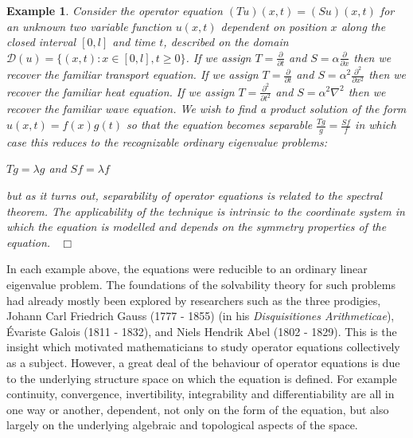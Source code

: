 \documentclass[12pt, oneside]{book}
\newtheorem{example}[theorem]{Example}
\newcommand{\qed}{\hfill ~$\Box$\\}
\begin{document}
\begin{example}
\normalfont
\noindent Consider the operator equation $(Tu)(x,t)=(Su)(x,t)$ for an unknown two variable function $u(x,t)$ dependent on position $x$ along the closed interval $[0,l]$ and time $t$,  described on the domain $\mathscr{D}(u)=\{ (x,t): x \in [0,l], t \geq 0 \}$.
\vskip 0.3cm
\noindent If we assign $T = \frac{\partial}{\partial t}$ and $S = \alpha \frac{\partial }{\partial x}$ then we recover the familiar transport equation.
\vskip 0.3cm
\noindent If we assign $T = \frac{\partial}{\partial t}$ and $S = \alpha^2 \frac{\partial^2 }{\partial x^2}$ then we recover the familiar heat equation.
\vskip 0.3cm
\noindent If we assign $T = \frac{\partial^2}{\partial t^2}$ and $S = \alpha^2 \nabla^2$ then we recover the familiar wave equation.
\vskip 0.3cm
\noindent We wish to find a product solution of the form $u(x,t)=f(x)g(t)$ so that the equation becomes separable $\frac{Tg}{g} = \frac{Sf}{f}$ in which case this reduces to the recognizable ordinary eigenvalue problems:
\begin{center}
$Tg= \lambda g$ \quad and \quad $Sf = \lambda f$
\end{center}
\noindent but as it turns out, separability of operator equations is related to the spectral theorem. The applicability of the technique is intrinsic to the coordinate system in which the equation is modelled and depends on the symmetry properties of the equation.
\qed
\end{example}
\noindent In each example above, the equations were reducible to an ordinary linear eigenvalue problem. The foundations of the solvability theory for such problems had already mostly been explored by researchers such as the three prodigies, Johann Carl Friedrich Gauss (1777 - 1855) 
(in his \textit{Disquisitiones Arithmeticae}), \'Evariste Galois (1811 - 1832), and Niels Hendrik Abel (1802 - 1829). 
This is the insight which motivated mathematicians to study operator equations collectively as a subject.
However, a great deal of the behaviour of operator equations is due to the underlying structure space on which the equation is defined. For example continuity, convergence, invertibility, integrability and
 differentiability are all in one way or another, dependent, not only on the form of the equation, but also largely on the underlying algebraic and topological aspects of the space.
\vskip 0.3cm
\end{document}

